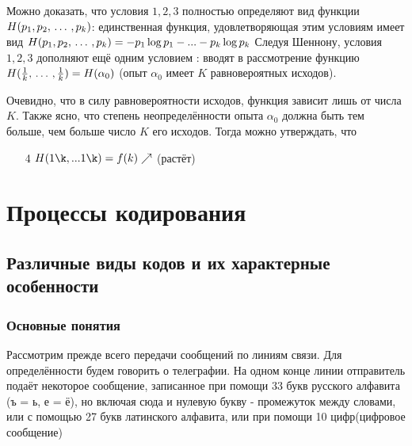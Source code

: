 ﻿\documentclass[a4paper,12pt]{report}
\begin{document}

	
	Можно доказать, что условия $1,2,3$ полностью определяют вид функции $H(p_1,p_2, \,\ldots\, ,p_k)$: единственная функция, удовлетворяющая этим условиям имеет вид $H(p_1,p_2, \,\ldots\, ,p_k) = -p_1\log p_1 - ... - p_k \log p_k$
	Следуя Шеннону, условия $1,2,3$ дополняют ещё одним условием : вводят в рассмотрение функцию $H(\frac{1}{k}, \,\ldots\, ,\frac{1}{k}) = H(\alpha_0)$ (опыт $\alpha_0$ имеет $K$ равновероятных исходов). 
	
	Очевидно, что в силу равновероятности исходов, функция зависит лишь от числа $K$. Также ясно, что степень неопределённости опыта $\alpha_0$ должна быть тем больше, чем больше число $K$ его исходов. Тогда можно утверждать, что
	
	
	\begin{enumerate}

	\item[4] $H(1\k,...1\k) = f(k)\nearrow$ (растёт)
	
	\end{enumerate}		
	


	
	\pagebreak
	
	\section{Процессы кодирования}
	
	
	
	
	\subsection{Различные виды кодов и их характерные особенности}
	
	
	
	
	\subsubsection{Основные понятия}
	
	Рассмотрим прежде всего  передачи сообщений по линиям связи. Для определённости будем говорить о телеграфии. На одном конце линии отправитель подаёт некоторое сообщение, записанное при помощи 33 букв русского алфавита (ъ = ь, е = ё), но включая сюда и нулевую букву - промежуток между словами, или с помощью 27 букв латинского алфавита, или при помощи 10 цифр(цифровое сообщение)
	
\end{document}
